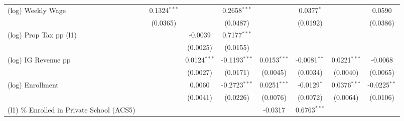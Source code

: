 \documentclass[
  10pt,
]{article}
\begin{document}
\begin{table}[htbp]
\begin{adjustbox}{max width=\linewidth}
\begin{tabular}{lcccccccc}
         (log) Weekly Wage                              &                     & 0.1324$^{***}$          &                     & 0.2658$^{***}$        &                        & 0.0377$^{*}$                          &                        & 0.0590\\   
                                                        &                     & (0.0365)                &                     & (0.0487)              &                        & (0.0192)                              &                        & (0.0386)\\   
         (log) Prop Tax pp (l1)                         &                     &                         & -0.0039             & 0.7177$^{***}$        &                        &                                       &                        &   \\   
                                                        &                     &                         & (0.0025)            & (0.0155)              &                        &                                       &                        &   \\   
         (log) IG Revenue pp                            &                     &                         & 0.0124$^{***}$      & -0.1193$^{***}$       & 0.0153$^{***}$         & -0.0081$^{**}$                        & 0.0221$^{***}$         & -0.0068\\   
                                                        &                     &                         & (0.0027)            & (0.0171)              & (0.0045)               & (0.0034)                              & (0.0040)               & (0.0065)\\   
         (log) Enrollment                               &                     &                         & 0.0060              & -0.2723$^{***}$       & 0.0251$^{***}$         & -0.0129$^{*}$                         & 0.0376$^{***}$         & -0.0225$^{**}$\\   
                                                        &                     &                         & (0.0041)            & (0.0226)              & (0.0076)               & (0.0072)                              & (0.0064)               & (0.0106)\\   
         (l1) \% Enrolled in Private School (ACS5)      &                     &                         &                     &                       & -0.0317                & 0.6763$^{***}$                        &                        &   \\   

\end{tabular}
\end{adjustbox}
\end{table}
\end{document}
